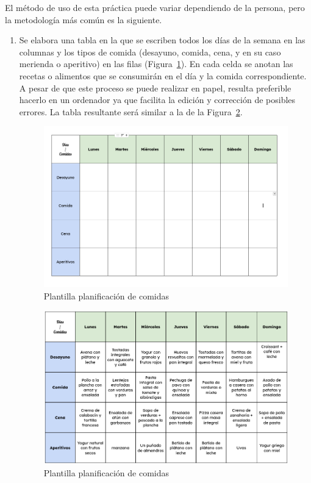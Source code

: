 \documentclass[twoside, openright, 11pt]{report}
\begin{document}
	  El método de uso de esta práctica puede variar dependiendo de la persona, pero la metodología más común es la siguiente.
	  
	  \begin{enumerate}
	  	\item Se elabora una tabla en la que se escriben todos los días de la semana en las columnas y los tipos de comida (desayuno, comida, cena, y en su caso merienda o aperitivo) en las filas  (Figura~\ref{fig:Plantillamealplan}). En cada celda se anotan las recetas o alimentos que se consumirán en el día y la comida correspondiente. A pesar de que este proceso se puede realizar en papel, resulta preferible hacerlo en un ordenador ya que facilita la edición y corrección de posibles errores. La tabla resultante será similar a la de la Figura~\ref{fig:Plantillamealplanrellenada}.
	  	
	  	\begin{figure}[H]
	  		\centering
	  		\includegraphics[width=1\textwidth]{./imagenes/PlantillaTablamealPlanning.png}
	  		\caption{Plantilla planificación de comidas}
	  		\label{fig:Plantillamealplan}
	  	\end{figure}	
	  	
	  	\begin{figure}[H]
	  		\centering
	  		\includegraphics[width=1\textwidth]{./imagenes/PlantillaMealPlanningRellenada.png}
	  		\caption{Plantilla planificación de comidas}
	  		\label{fig:Plantillamealplanrellenada}
	  	\end{figure}	
	  	

\end{enumerate}
\end{document}

